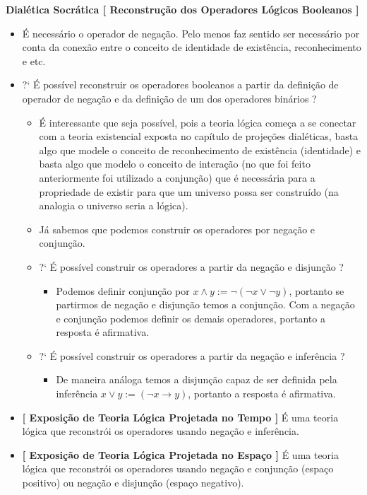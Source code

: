 \documentclass[10pt,a4paper]{report}
\begin{document}
\hspace{\baselineskip}

\textbf{Dialética Socrática [ Reconstrução dos Operadores Lógicos Booleanos ]}

\begin{itemize}
	\item[ (1) ] É necessário o operador de negação. Pelo menos faz sentido ser necessário por conta da conexão entre o conceito de identidade de existência, reconhecimento e etc.
	\item[ (2) ] ?` É possível reconstruir os operadores booleanos a partir da definição de operador de negação e da definição de um dos operadores binários ?
	\begin{itemize}
		\item[ (1) ] É interessante que seja possível, pois a teoria lógica começa a se conectar com a teoria existencial exposta no capítulo de projeções dialéticas, basta algo que modele o conceito de reconhecimento de existência (identidade) e basta algo que modelo o conceito de interação (no que foi feito anteriormente foi utilizado a conjunção) que é necessária para a propriedade de existir para que um universo possa ser construído (na analogia o universo seria a lógica).
		\item[ (2) ] Já sabemos que podemos construir os operadores por negação e conjunção.
		\item[ (3) ] ?` É possível construir os operadores a partir da negação e disjunção ?
		\begin{itemize}
			\item[ (1) ] Podemos definir conjunção por $x \wedge y := \neg( \neg x \vee \neg y )$, portanto se partirmos de negação e disjunção temos a conjunção. Com a negação e conjunção podemos definir os demais operadores, portanto a resposta é afirmativa.
		\end{itemize}
		\item[ (4) ] ?` É possível construir os operadores a partir da negação e inferência ?
		\begin{itemize}
			\item[ (1) ] De maneira análoga temos a disjunção capaz de ser definida pela inferência $ x \vee y := (\neg x \rightarrow y) $, portanto a resposta é afirmativa.
		\end{itemize}
	\end{itemize}
	\item[ (3) ] \textbf{[ Exposição de Teoria Lógica Projetada no Tempo ]} É uma teoria lógica que reconstrói os operadores usando negação e inferência.
	\item[ (4) ] \textbf{[ Exposição de Teoria Lógica Projetada no Espaço ]} É uma teoria lógica que reconstrói os operadores usando negação e conjunção (espaço positivo) ou negação e disjunção (espaço negativo).
\end{itemize}
\end{document}
